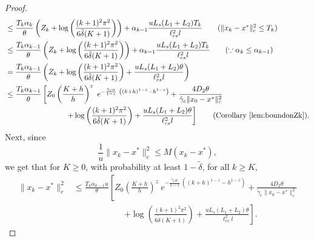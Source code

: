 \documentclass{article}
\newcommand{\lrp}[1]{\left( #1 \right)}
\newcommand{\lcs}{\ell_{cs}}
\begin{document}
\begin{proof}
\begin{align*}
    &\le \frac{T_k \alpha_k}{\theta}\lrp{Z_k + \log\left(\frac{(k+1)^2\pi^2}{6\tilde{\delta} (K+1)}\right)} 
    + \alpha_{k-1}\frac{u L_s (L_1 + L_2) T_k}{\lcs^2 l} \tag{$\|x_k - x^*\|^2_c \leq T_k$}\\
    &\le \frac{T_k \alpha_{k-1}}{\theta}\lrp{Z_k + \log\left(\frac{(k+1)^2\pi^2}{6\tilde{\delta} (K+1)}\right)} 
    + \alpha_{k-1}\frac{ u L_s (L_1 + L_2) T_k}{\lcs^2 l} \tag{$\because \alpha_k \le \alpha_{k-1}$}\\
    &= \frac{T_k \alpha_{k-1}}{\theta}\lrp{Z_k + \log\left(\frac{(k+1)^2\pi^2}{6\tilde{\delta} (K+1)}\right) 
    + \frac{u L_s (L_1 + L_2) \theta}{\lcs^2 l} }\\
    &\le \frac{T_k \alpha_{k-1}}{\theta}\left[ Z_0\lrp{ \frac{K+h}{h} }^z ~ e^{-\frac{\tilde{\gamma}_c\alpha}{1-z}~\lrp{(k+h)^{1-z} - h^{1-z}} } +  \frac{4 D_2\theta  }{\tilde{\gamma}_c\|x_0-x^*\|^2_c  } \right. \\
    & \qquad \qquad \qquad \qquad \left. + \log\left(\frac{(k+1)^2\pi^2}{6\tilde{\delta} (K+1)}\right) 
    + \frac{u L_s(L_1+L_2) \theta}{\lcs^2 l} \right] \tag{Corollary~\ref{lem:boundonZk}}.%
 \end{align*}
Next, since
\[ \frac{1}{u} \|x_k - x^*\|^2_c \le M(x_k-x^*),\]
we get that for $K\ge 0$, with probability at least $1 - \tilde{\delta}$, for all $k\ge K$, 
\begin{align*}
    \|x_k-x^*\|^2_c &\le \frac{T_k \alpha_{k-1} u}{\theta}\left[ Z_0\lrp{ \frac{K+h}{h} }^z ~ e^{-\frac{\tilde{\gamma}_c\alpha}{1-z}~\lrp{(k+h)^{1-z} - h^{1-z}} } +  \frac{4 D_2\theta}{\tilde{\gamma}_c\|x_0-x^*\|^2_c  } \right. \\
    &  \qquad \qquad \qquad \left. + \log\left(\frac{\lrp{k+1}^2\pi^2}{6\tilde{\delta} (K+1)}\right) 
    + \frac{u L_s (L_1+ L_2) \theta}{\lcs^2 l} \right].
\end{align*}


\end{proof}
\end{document}

